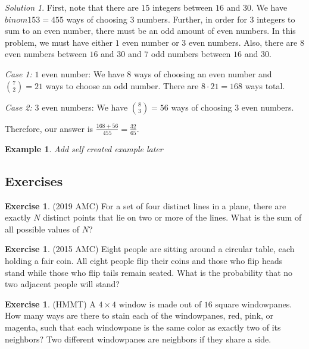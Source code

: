 \documentclass[letterpaper]{article}
\newtheorem{example}[thm]{Example}
\theoremstyle{remark}
\newtheorem*{solution}{Solution}
\theoremstyle{definition}
\newtheorem{exercise}[thm]{Exercise}
\begin{document}
\begin{solution}
First, note that there are $15$ integers between $16$ and $30$. We have $binom{15}{3}=455$ ways of choosing $3$ numbers. Further, in order for $3$ integers to sum to an even number, there must be an odd amount of even numbers. In this problem, we must have either $1$ even number or $3$ even numbers. Also, there are $8$ even numbers between $16$ and $30$ and $7$ odd numbers between $16$ and $30$.
\newline

\textit{Case 1:} $1$ even number: We have $8$ ways of choosing an even number and $\binom{7}{2}=21$ ways to choose an odd number. There are $8\cdot 21=168$ ways total.
\newline

\textit{Case 2:} $3$ even numbers: We have $\binom{8}{3}=56$ ways of choosing $3$ even numbers. 
\newline

Therefore, our answer is $\frac{168+56}{455}=\frac{32}{65}$.

\end{solution}

\begin{example}
Add self created example later
\end{example}

\subsection*{Exercises}

\begin{exercise}
(2019 AMC) For a set of four distinct lines in a plane, there are exactly $N$ distinct points that lie on two or more of the lines. What is the sum of all possible values of $N$?
\end{exercise}
 
\begin{exercise}
(2015 AMC) Eight people are sitting around a circular table, each holding a fair coin. All eight people flip their coins and those who flip heads stand while those who flip tails remain seated. What is the probability that no two adjacent people will stand?
\end{exercise}

\begin{exercise}
(HMMT) A $4\times 4$ window is made out of $16$ square windowpanes. How many ways are there to stain each of the windowpanes, red, pink, or magenta, such that each windowpane is the same color as exactly two of its neighbors? Two different windowpanes are neighbors if they share a side.
\end{exercise}
\end{document}

